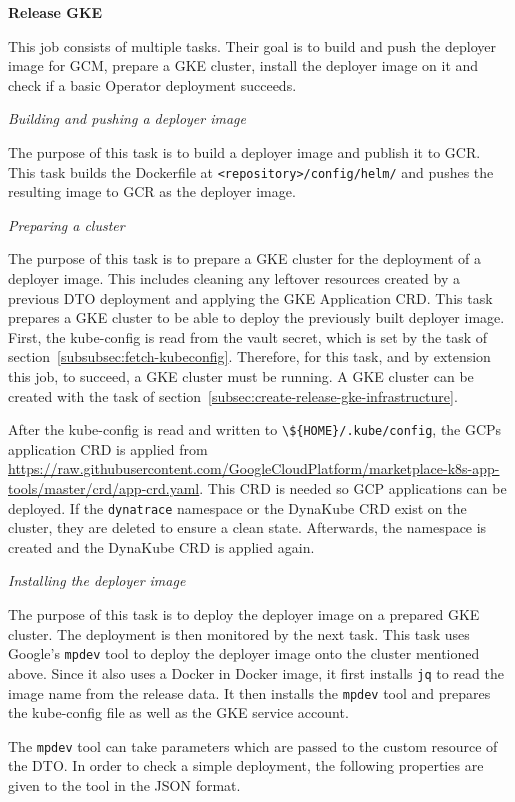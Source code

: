 \textbf{Release GKE}

This job consists of multiple tasks.
Their goal is to build and push the deployer image for GCM, prepare a GKE cluster, install the deployer image on it and check if a basic Operator deployment succeeds.

\textit{Building and pushing a deployer image}

The purpose of this task is to build a deployer image and publish it to GCR.
This task builds the Dockerfile at \verb|<repository>/config/helm/| and pushes the resulting image to GCR as the deployer image.

\textit{Preparing a cluster}

The purpose of this task is to prepare a GKE cluster for the deployment of a deployer image.
This includes cleaning any leftover resources created by a previous DTO deployment and applying the GKE Application CRD.
This task prepares a GKE cluster to be able to deploy the previously built deployer image.
First, the kube-config is read from the vault secret, which is set by the task of section~\ref{subsubsec:fetch-kubeconfig}.
Therefore, for this task, and by extension this job, to succeed, a GKE cluster must be running.
A GKE cluster can be created with the task of section~\ref{subsec:create-release-gke-infrastructure}.

After the kube-config is read and written to \verb|\${HOME}/.kube/config|, the GCPs application CRD is applied from \url{https://raw.githubusercontent.com/GoogleCloudPlatform/marketplace-k8s-app-tools/master/crd/app-crd.yaml}.
This CRD is needed so GCP applications can be deployed.
If the \verb|dynatrace| namespace or the DynaKube CRD exist on the cluster, they are deleted to ensure a clean state.
Afterwards, the namespace is created and the DynaKube CRD is applied again.

\textit{Installing the deployer image}

The purpose of this task is to deploy the deployer image on a prepared GKE cluster.
The deployment is then monitored by the next task.
This task uses Google's \verb|mpdev| tool to deploy the deployer image onto the cluster mentioned above.
Since it also uses a Docker in Docker image, it first installs \verb|jq| to read the image name from the release data.
It then installs the \verb|mpdev| tool and prepares the kube-config file as well as the GKE service account.

The \verb|mpdev| tool can take parameters which are passed to the custom resource of the DTO.
In order to check a simple deployment, the following properties are given to the tool in the JSON format.

